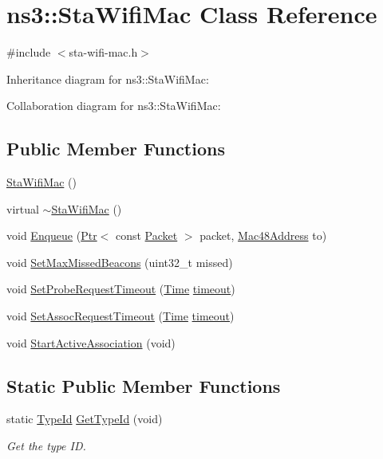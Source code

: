 \hypertarget{classns3_1_1StaWifiMac}{}\section{ns3\+:\+:Sta\+Wifi\+Mac Class Reference}
\label{classns3_1_1StaWifiMac}


{\ttfamily \#include $<$sta-\/wifi-\/mac.\+h$>$}



Inheritance diagram for ns3\+:\+:Sta\+Wifi\+Mac\+:


Collaboration diagram for ns3\+:\+:Sta\+Wifi\+Mac\+:
\subsection*{Public Member Functions}
\begin{DoxyCompactItemize}
\item 
\hyperlink{classns3_1_1StaWifiMac_afdd976cc1453f809bb1cad9924e9ff04}{Sta\+Wifi\+Mac} ()
\item 
virtual \hyperlink{classns3_1_1StaWifiMac_a0cf05c1195d7d1c0cfbc8b76abd13c60}{$\sim$\+Sta\+Wifi\+Mac} ()
\item 
void \hyperlink{classns3_1_1StaWifiMac_aac28ec947ebda4162641f9694f5cac28}{Enqueue} (\hyperlink{classns3_1_1Ptr}{Ptr}$<$ const \hyperlink{classns3_1_1Packet}{Packet} $>$ packet, \hyperlink{classns3_1_1Mac48Address}{Mac48\+Address} to)
\item 
void \hyperlink{classns3_1_1StaWifiMac_a2e0c9df1e0e666cc0b9b9b5a194bade8}{Set\+Max\+Missed\+Beacons} (uint32\+\_\+t missed)
\item 
void \hyperlink{classns3_1_1StaWifiMac_a7aac2e5382a6e6513c157e074b691d30}{Set\+Probe\+Request\+Timeout} (\hyperlink{classns3_1_1Time}{Time} \hyperlink{openflow-switch_8cc_a386d174ae121d1cfa279074b7e209714}{timeout})
\item 
void \hyperlink{classns3_1_1StaWifiMac_ad6bd47f77998d44e7e3a433991266d82}{Set\+Assoc\+Request\+Timeout} (\hyperlink{classns3_1_1Time}{Time} \hyperlink{openflow-switch_8cc_a386d174ae121d1cfa279074b7e209714}{timeout})
\item 
void \hyperlink{classns3_1_1StaWifiMac_aaa21db3777f643456ca7c37f13a4a283}{Start\+Active\+Association} (void)
\end{DoxyCompactItemize}
\subsection*{Static Public Member Functions}
\begin{DoxyCompactItemize}
\item 
static \hyperlink{classns3_1_1TypeId}{Type\+Id} \hyperlink{classns3_1_1StaWifiMac_a9a7063e5d183bb288d8ab157a102196c}{Get\+Type\+Id} (void)
\begin{DoxyCompactList}\small\item\em Get the type ID. \end{DoxyCompactList}\end{DoxyCompactItemize}
